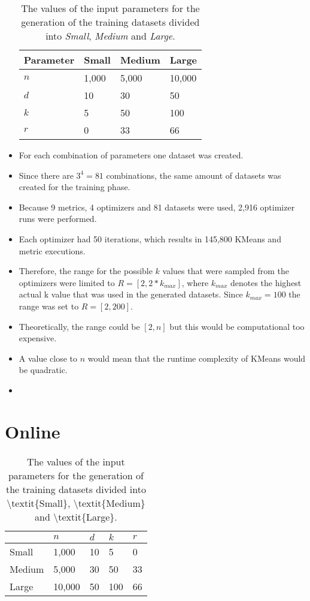 \begin{itemize}
\begin{table}[]
\centering
\caption{The values of the input parameters for the generation of the training datasets divided into \textit{Small}, \textit{Medium} and \textit{Large}.}
\label{tab:parametersOfflinePhase}
\begin{tabular}{@{}llll@{}}
\toprule
Parameter    & Small & Medium & Large  \\ \midrule
$n$ & 1,000 & 5,000  & 10,000 \\
$d$ & 10    & 30     & 50     \\
$k$ & 5     & 50     & 100    \\
$r$ & 0     & 33     & 66     \\ \bottomrule
\end{tabular}
\end{table}
\item For each combination of parameters one dataset was created.
\item Since there are $3^4 = 81$ combinations, the same amount of datasets was created for the training phase.
\item Because 9 metrics, 4 optimizers and 81 datasets were used, 2,916 optimizer runs were performed.
\item Each optimizer had 50 iterations, which results in 145,800 KMeans and metric executions.
\item Therefore, the range for the possible $k$ values that were sampled from the optimizers were limited to $R=[2, 2 * k_{max}]$, where $k_{max}$ denotes the highest actual k value that was used in the generated datasets.
Since $k_{max}=100$ the range was set to $R=[2, 200]$.
\item Theoretically, the range could be $[2, n]$ but this would be computational too expensive.
\item A value close to $n$ would mean that the runtime complexity of KMeans would be quadratic.
\item 
\end{itemize}
\section{Online}



\begin{table}[]
\centering
\caption{The values of the input parameters for the generation of the training datasets divided into \textbackslash{}textit\{Small\}, \textbackslash{}textit\{Medium\} and \textbackslash{}textit\{Large\}.}
\label{tab:parametersOfflinePhase}
\begin{tabular}{@{}lllll@{}}
\toprule
       & $n$    & $d$ & $k$ & $r$ \\ \midrule
Small  & 1,000  & 10  & 5   & 0   \\
Medium & 5,000  & 30  & 50  & 33  \\
Large  & 10,000 & 50  & 100 & 66  \\ \bottomrule
\end{tabular}
\end{table}
